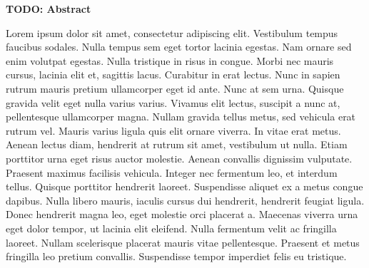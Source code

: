 \textbf{TODO: Abstract}

Lorem ipsum dolor sit amet, consectetur adipiscing elit. Vestibulum tempus faucibus sodales. Nulla tempus sem eget tortor lacinia egestas. Nam ornare sed enim volutpat egestas. Nulla tristique in risus in congue. Morbi nec mauris cursus, lacinia elit et, sagittis lacus. Curabitur in erat lectus. Nunc in sapien rutrum mauris pretium ullamcorper eget id ante. Nunc at sem urna. Quisque gravida velit eget nulla varius varius. Vivamus elit lectus, suscipit a nunc at, pellentesque ullamcorper magna. Nullam gravida tellus metus, sed vehicula erat rutrum vel. Mauris varius ligula quis elit ornare viverra. In vitae erat metus. Aenean lectus diam, hendrerit at rutrum sit amet, vestibulum ut nulla. Etiam porttitor urna eget risus auctor molestie. Aenean convallis dignissim vulputate. Praesent maximus facilisis vehicula. Integer nec fermentum leo, et interdum tellus. Quisque porttitor hendrerit laoreet. Suspendisse aliquet ex a metus congue dapibus. Nulla libero mauris, iaculis cursus dui hendrerit, hendrerit feugiat ligula. Donec hendrerit magna leo, eget molestie orci placerat a. Maecenas viverra urna eget dolor tempor, ut lacinia elit eleifend. Nulla fermentum velit ac fringilla laoreet. Nullam scelerisque placerat mauris vitae pellentesque. Praesent et metus fringilla leo pretium convallis. Suspendisse tempor imperdiet felis eu tristique.
